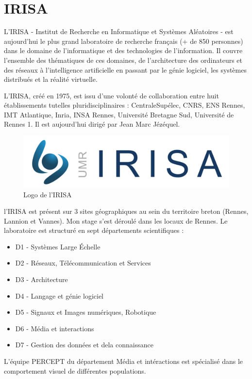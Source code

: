 \chapter{IRISA}

\par
L'IRISA - Institut de Recherche en Informatique et Systèmes Aléatoires - est
aujourd'hui le plus grand laboratoire de recherche français (+ de 850 personnes)
dans le domaine de l'informatique et des technologies de l'information. Il
couvre l'ensemble des thématiques de ces domaines, de l'architecture des
ordinateurs et des réseaux à l'intelligence artificielle en passant par le génie
logiciel, les systèmes distribués et la réalité virtuelle.

\par
L'IRISA, créé en 1975, est issu d'une volonté de collaboration entre huit établissements tutelles pluridisciplinaires : CentraleSupélec, CNRS, ENS Rennes, IMT Atlantique, Inria, INSA Rennes, Université Bretagne Sud, Université de Rennes 1. Il est aujourd'hui dirigé par Jean Marc Jézéquel.

\begin{figure}[h]
    \centering
    \includegraphics[width=0.7\linewidth]{datas/logo_irisa.jpg}
    \caption{Logo de l'IRISA}
\end{figure}

\par
l'IRISA est présent sur 3 sites géographiques au sein du territoire breton (Rennes, Lannion et Vannes). Mon stage s'est déroulé dans les locaux de Rennes.
Le laboratoire est structuré en sept départements scientifiques :
\begin{itemize}
    \item D1 - Systèmes Large Échelle
    \item D2 - Réseaux, Télécommunication et Services
    \item D3 - Architecture
    \item D4 - Langage et génie logiciel
    \item D5 - Signaux et Images numériques, Robotique
    \item D6 - Média et interactions
    \item D7 - Gestion des données et dela connaissance
\end{itemize}


\par
L'équipe PERCEPT du département Média et intéractions est spécialisé dans le comportement visuel de différentes populations.